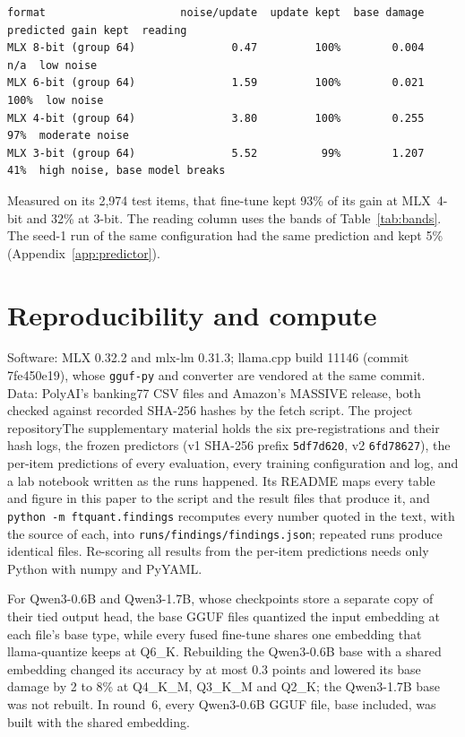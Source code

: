 \documentclass[10pt]{article}
\newcommand{\Suppname}{\ifdefined\tmlrpreprint The project repository\else The supplementary material\fi}
\begin{document}
\begin{scriptsize}
\begin{verbatim}
format                     noise/update  update kept  base damage  predicted gain kept  reading
MLX 8-bit (group 64)               0.47         100%        0.004                  n/a  low noise
MLX 6-bit (group 64)               1.59         100%        0.021                 100%  low noise
MLX 4-bit (group 64)               3.80         100%        0.255                  97%  moderate noise
MLX 3-bit (group 64)               5.52          99%        1.207                  41%  high noise, base model breaks
\end{verbatim}
\end{scriptsize}

\noindent Measured on its 2,974 test items, that fine-tune kept 93\% of its gain at MLX~4-bit and 32\% at 3-bit. The reading column uses the bands of Table~\ref{tab:bands}. The seed-1 run of the same configuration had the same prediction and kept 5\% (Appendix~\ref{app:predictor}).

\section{Reproducibility and compute}
\label{app:repro}

Software: MLX 0.32.2 and mlx-lm 0.31.3; llama.cpp build 11146 (commit 7fe450e19), whose \texttt{gguf-py} and converter are vendored at the same commit. Data: PolyAI's banking77 CSV files and Amazon's MASSIVE release, both checked against recorded SHA-256 hashes by the fetch script. \Suppname{} holds the six pre-registrations and their hash logs, the frozen predictors (v1 SHA-256 prefix \texttt{5df7d620}, v2 \texttt{6fd78627}), the per-item predictions of every evaluation, every training configuration and log, and a lab notebook written as the runs happened. Its README maps every table and figure in this paper to the script and the result files that produce it, and \texttt{python -m ftquant.findings} recomputes every number quoted in the text, with the source of each, into \texttt{runs/findings/findings.json}; repeated runs produce identical files. Re-scoring all results from the per-item predictions needs only Python with numpy and PyYAML.

For Qwen3-0.6B and Qwen3-1.7B, whose checkpoints store a separate copy of their tied output head, the base GGUF files quantized the input embedding at each file's base type, while every fused fine-tune shares one embedding that llama-quantize keeps at Q6\_K. Rebuilding the Qwen3-0.6B base with a shared embedding changed its accuracy by at most 0.3 points and lowered its base damage by 2 to 8\% at Q4\_K\_M, Q3\_K\_M and Q2\_K; the Qwen3-1.7B base was not rebuilt. In round~6, every Qwen3-0.6B GGUF file, base included, was built with the shared embedding.
\end{document}
